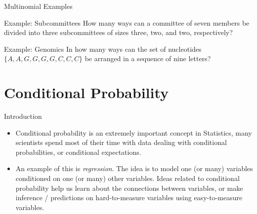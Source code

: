 \begin{frame}[allowframebreaks]{Multinomial Examples}
  \begin{exampleblock}{Example: Subcommittees}
    How many ways can a committee of seven members be divided into three subcommittees of sizes three, two, and two, respectively?
  \end{exampleblock}
  
  \framebreak
  
  \begin{exampleblock}{Example: Genomics}
    In how many ways can the set of nucleotides $\{A, A, G, G, G, G, C, C, C\}$ be arranged in a sequence of nine letters? 
    
  \end{exampleblock}
  
\end{frame}

\section{Conditional Probability}

\begin{frame}{Introduction}
    
  \begin{itemize}
    \item \alert{Conditional probability} is an extremely important concept in Statistics, many scientists spend most of their time with data dealing with conditional probabilities, or conditional expectations.
  
    \item An example of this is \emph{regression}.
  The idea is to model one (or many) variables conditioned on one (or many) other variables.
  Ideas related to conditional probability help us learn about the connections between variables, or make inference / predictions on hard-to-measure variables using easy-to-measure variables.
  \end{itemize}
  
\end{frame}

